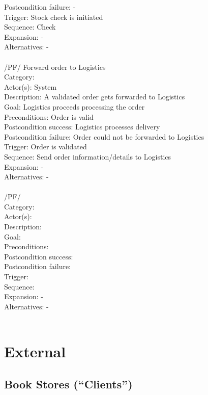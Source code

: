\documentclass[11pt,a4paper,oneside,svgnames]{report}
\begin{document}
\begin{tabbing}
	 Postcondition failure: \> -\\
	 Trigger: \> Stock check is initiated\\
	 Sequence: \> Check \\
	 Expansion: \> -\\
	 Alternatives: \> -\\
	 \\
	 /PF/ \> Forward order to Logistics\\ 
	 Category: \> \\
	 Actor(s): \> System\\ 
	 Description: \> A validated order gets forwarded to Logistics\\ 
	 Goal: \> Logistics proceeds processing the order\\
	 Preconditions: \> Order is valid\\
	 Postcondition success: \> Logistics processes delivery\\
	 Postcondition failure: \> Order could not be forwarded to Logistics\\
	 Trigger: \> Order is validated\\
	 Sequence: \> Send order information/details to Logistics\\
	 Expansion: \> -\\
	 Alternatives: \> -\\
	 \\
	 /PF/ \> \\ 
	 Category: \> \\
	 Actor(s): \> \\ 
	 Description: \> \\ 
	 Goal: \> \\
	 Preconditions: \> \\
	 Postcondition success: \> \\
	 Postcondition failure: \> \\
	 Trigger: \> \\
	 Sequence: \> \\
	 Expansion: \> -\\
	 Alternatives: \> -\\
	 \\
\end{tabbing} 
\clearpage

\section{External}
\subsection{Book Stores (``Clients'')}
\end{document}
